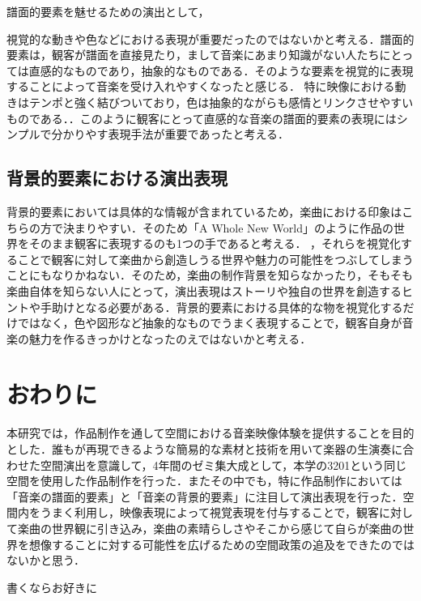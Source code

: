 譜面的要素を魅せるための演出として，

視覚的な動きや色などにおける表現が重要だったのではないかと考える．譜面的要素は，観客が譜面を直接見たり，まして音楽にあまり知識がない人たちにとっては直感的なものであり，抽象的なものである．そのような要素を視覚的に表現することによって音楽を受け入れやすくなったと感じる．
特に映像における動きはテンポと強く結びついており，色は抽象的ながらも感情とリンクさせやすいものである．．このように観客にとって直感的な音楽の譜面的要素の表現にはシンプルで分かりやす表現手法が重要であったと考える．

\subsection{背景的要素における演出表現}

背景的要素においては具体的な情報が含まれているため，楽曲における印象はこちらの方で決まりやすい．そのため「A Whole New World」のように作品の世界をそのまま観客に表現するのも1つの手であると考える．
，それらを視覚化することで観客に対して楽曲から創造しうる世界や魅力の可能性をつぶしてしまうことにもなりかねない．そのため，楽曲の制作背景を知らなかったり，そもそも楽曲自体を知らない人にとって，演出表現はストーリや独自の世界を創造するヒントや手助けとなる必要がある．背景的要素における具体的な物を視覚化するだけではなく，色や図形など抽象的なものでうまく表現することで，観客自身が音楽の魅力を作るきっかけとなったのえではないかと考える．

\section{おわりに}
本研究では，作品制作を通して空間における音楽映像体験を提供することを目的とした．誰もが再現できるような簡易的な素材と技術を用いて楽器の生演奏に合わせた空間演出を意識して，4年間のゼミ集大成として，本学の3201という同じ空間を使用した作品制作を行った．またその中でも，特に作品制作においては「音楽の譜面的要素」と「音楽の背景的要素」に注目して演出表現を行った．空間内をうまく利用し，映像表現によって視覚表現を付与することで，観客に対して楽曲の世界観に引き込み，楽曲の素晴らしさやそこから感じて自らが楽曲の世界を想像することに対する可能性を広げるための空間政策の追及をできたのではないかと思う．






\begin{acknowledgment}
	書くならお好きに
\end{acknowledgment}

